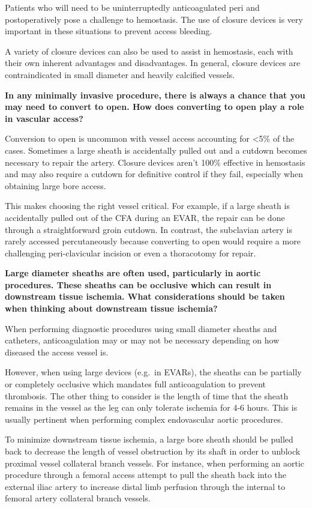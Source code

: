 \documentclass[
]{book}
\begin{document}
Patients who will need to be uninterruptedly anticoagulated peri and
postoperatively pose a challenge to hemostasis. The use of closure
devices is very important in these situations to prevent access
bleeding.

A variety of closure devices can also be used to assist in hemostasis,
each with their own inherent advantages and disadvantages. In general,
closure devices are contraindicated in small diameter and heavily
calcified vessels.

\textbf{In any minimally invasive procedure, there is always a chance that you
may need to convert to open. How does converting to open play a role in
vascular access?}

Conversion to open is uncommon with vessel access accounting for \textless5\% of
the cases. Sometimes a large sheath is accidentally pulled out and a
cutdown becomes necessary to repair the artery. Closure devices aren't
100\% effective in hemostasis and may also require a cutdown for
definitive control if they fail, especially when obtaining large bore
access.

This makes choosing the right vessel critical. For example, if a large
sheath is accidentally pulled out of the CFA during an EVAR, the repair
can be done through a straightforward groin cutdown. In contrast, the
subclavian artery is rarely accessed percutaneously because converting
to open would require a more challenging peri-clavicular incision or
even a thoracotomy for repair.

\textbf{Large diameter sheaths are often used, particularly in aortic
procedures. These sheaths can be occlusive which can result in
downstream tissue ischemia. What considerations should be taken when
thinking about downstream tissue ischemia?}

When performing diagnostic procedures using small diameter sheaths and
catheters, anticoagulation may or may not be necessary depending on how
diseased the access vessel is.

However, when using large devices (e.g.~in EVARs), the sheaths can be
partially or completely occlusive which mandates full anticoagulation to
prevent thrombosis. The other thing to consider is the length of time
that the sheath remains in the vessel as the leg can only tolerate
ischemia for 4-6 hours. This is usually pertinent when performing
complex endovascular aortic procedures.

To minimize downstream tissue ischemia, a large bore sheath should be
pulled back to decrease the length of vessel obstruction by its shaft in
order to unblock proximal vessel collateral branch vessels. For
instance, when performing an aortic procedure through a femoral access
attempt to pull the sheath back into the external iliac artery to
increase distal limb perfusion through the internal to femoral artery
collateral branch vessels.
\end{document}
